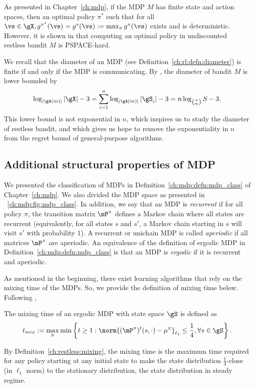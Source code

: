 As presented in Chapter~\ref{ch:mdp}, if the MDP $M$ has finite state and action spaces, then an optimal policy $\pi^*$ such that for all $\vs\in\gX, g^{\pi^*}(\vs)=g^*(\vs):=\max_{\pi}g^{\pi}(\vs)$ exists and is deterministic.
However, it is shown in \cite[Theorem~4]{papadimitriou1994complexity} that computing an optimal policy in undiscounted restless bandit $M$ is PSPACE-hard.

We recall that the diameter of an MDP (see Definition~\ref{ch:rl:defn:diameter}) is finite if and only if the MDP is communicating.
By \cite[Appendix A]{jaksch2010near}, the diameter of bandit $M$ is lower bounded by
\begin{equation*}
    \log_{|\gA(m)|}|\gX| -3 = \sum_{i=1}^{n}\log_{|\gA(m)|}|\gS_i| -3 =n\log_{{n \choose m}}S -3.
\end{equation*}
This lower bound is not exponential in $n$, which inspires us to study the diameter of restless bandit, and which gives us hope to remove the exponentiality in $n$ from the regret bound of general-purpose algorithms.

\subsection{Additional structural properties of MDP}
\label{ssec:mdp_params}

We presented the classification of MDPs in Definition~\ref{ch:mdp:defn:mdp_class} of Chapter~\ref{ch:mdp}.
We also divided the MDP space as presented in \figurename~\ref{ch:mdp:fig:mdp_class}.
In addition, we say that an MDP is \emph{recurrent} if for all policy $\pi$, the transition matrix $\mP^\pi$ defines a Markov chain where all states are recurrent (equivalently, for all states $s$ and $s'$, a Markov chain starting in $s$ will visit $s'$ with probability $1$).
A recurrent or unichain MDP is called \emph{aperiodic} if all matrices $\mP^\pi$ are aperiodic.
An equivalence of the definition of ergodic MDP in Definition~\ref{ch:mdp:defn:mdp_class} is that an MDP is \emph{ergodic} if it is recurrent and aperiodic.

As mentioned in the beginning, there exist learning algorithms that rely on the mixing time of the MDPs.
So, we provide the definition of mixing time below.
Following \cite[Definition 5.1]{wei2020model},
\begin{defn}
    The mixing time of an ergodic MDP with state space $\gS$ is defined as
    \begin{align*}
        t_{mix} := \max_{\pi}\min\left\{ t\ge1 : \norm{(\mP^\pi)^t(s,\cdot) - \mu^\pi}_{\ell_1} \le \frac14, \forall s\in\gS\right\}.
    \end{align*}
    \label{ch:restless:mixing}
\end{defn}
By Definition~\ref{ch:restless:mixing}, the mixing time is the maximum time required for any policy starting at any initial state to make the state distribution $\frac14$-close (in $\ell_1$ norm) to the stationary distribution, the state distribution in steady regime.

